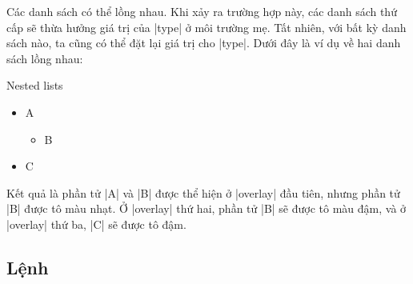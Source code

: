 Các danh sách có thể lồng nhau. Khi xảy ra trường hợp này, các danh sách
thứ cấp sẽ thừa hưởng giá trị của |type| ở môi trường mẹ.
Tất nhiên, với bất kỳ danh sách nào, ta cũng có thể đặt lại giá trị cho |type|.
Dưới đây là ví dụ về hai danh sách lồng nhau:
\begin{example}
 \begin{slide}{Nested lists}
   \begin{itemize}
     \item A\pause
     \begin{itemize}[type=1]
       \item B\pause
     \end{itemize}
     \item C
   \end{itemize}
 \end{slide}
\end{example}
Kết quả là phần tử |A| và |B| được thể hiện ở |overlay| đầu tiên,
nhưng phần tử |B| được tô màu nhạt. Ở |overlay| thứ hai, phần tử |B|
sẽ được tô màu đậm, và ở |overlay| thứ ba, |C| sẽ được tô đậm.


\subsection{\texorpdfstring{Lệnh}{Lenh} }

